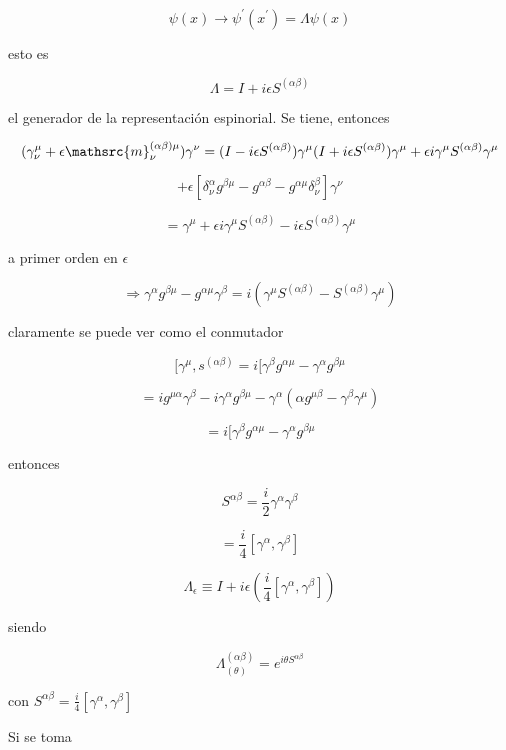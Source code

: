 \documentclass{report}
\begin{document}
\[\psi (x) \rightarrow \psi^{\prime} (x^{\prime}) = \Lambda \psi (x)\]

esto es

\[\Lambda = I + i\epsilon S^{(\alpha \beta)}\]

el generador de la representación espinorial. Se tiene, entonces

\[(\gamma^{\mu}_{\nu} + \epsilon \mathsrc{m}^{(\alpha \beta) \mu}_{\nu})\gamma^{\nu} = (I - i \epsilon S^{(\alpha \beta)})\gamma^{\mu} (I + i \epsilon S^{(\alpha \beta)}) \gamma^{\mu} + \epsilon i \gamma^{\mu} S^{(\alpha \beta)} \gamma^{\mu}\]

\[+ \epsilon[\delta^{\alpha}_{\nu} g^{\beta \mu} - g^{\alpha \beta} - g^{\alpha \mu} \delta^{\beta}_{\nu}]\gamma^{\nu}\]

\[= \gamma^{\mu} + \epsilon i \gamma^{\mu} S^{(\alpha \beta)} - i \epsilon S^{(\alpha \beta)} \gamma^{\mu}\]

a primer orden en $\epsilon$

\[\Rightarrow \gamma^{\alpha} g^{\beta \mu} - g^{\alpha \mu} \gamma^{\beta} = i (\gamma^{\mu} S^{(\alpha \beta)} - S^{(\alpha \beta)} \gamma^{\mu})\]

claramente se puede ver como el conmutador

\[[\gamma^{\mu},s^{(\alpha \beta)} = i [\gamma^{\beta} g^{\alpha \mu} - \gamma^{\alpha} g^{\beta \mu}\]



\[= i g^{\mu \alpha} \gamma^{\beta} - i \gamma^{\alpha} g^{\beta \mu} - \gamma^{\alpha} (\alpha g^{\mu \beta} - \gamma^{\beta} \gamma^{\mu}) \]

\[=i[\gamma^{\beta} g^{\alpha \mu} - \gamma^{\alpha} g^{\beta \mu}\]

entonces

\[S^{\alpha \beta} = \frac{i}{2} \gamma^{\alpha} \gamma^{\beta}\]

\begin{equation}
= \frac{i}{4} [\gamma^{\alpha}, \gamma^{\beta}]
\end{equation}

\[\Lambda_{\epsilon} \equiv I + i \epsilon (\frac{i}{4} [\gamma^{\alpha} , \gamma^{\beta}])\]

siendo

\[\Lambda^{(\alpha \beta)}_{(\theta)} = e^{i \theta S^{\alpha \beta}}\] 

con $S^{\alpha \beta} = \frac{i}{4} [\gamma^{\alpha}, \gamma^{\beta}]$


Si se toma 
\end{document}
